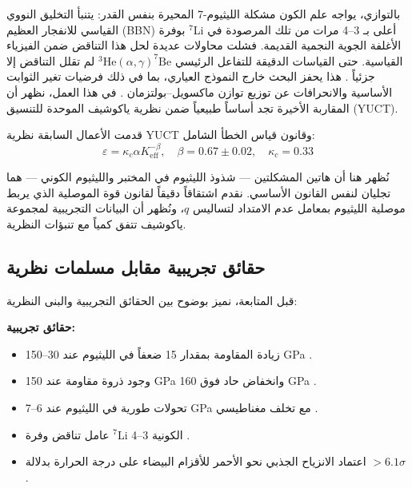 \documentclass[12pt,a4paper]{article}
\newcommand{\kappac}{\kappa_c}
\newcommand{\Ke}{K_{\mathrm{eff}}}
\newcommand{\alp}{\alpha}
\theoremstyle{remark}
\begin{document}
	بالتوازي، يواجه علم الكون مشكلة الليثيوم-7 المحيرة بنفس القدر: يتنبأ التخليق النووي القياسي للانفجار العظيم (BBN) بوفرة \(^7\)Li أعلى بـ 3–4 مرات من تلك المرصودة في الأغلفة الجوية النجمية القديمة. فشلت محاولات عديدة لحل هذا التناقض ضمن الفيزياء القياسية. حتى القياسات الدقيقة للتفاعل الرئيسي \(^3\mathrm{He}(\alpha,\gamma)^7\mathrm{Be}\) لم تقلل التناقض إلا جزئياً \cite{IAEA2017}. هذا يحفز البحث خارج النموذج العياري، بما في ذلك فرضيات تغير الثوابت الأساسية \cite{HAL2006} والانحرافات عن توزيع توازن ماكسويل–بولتزمان \cite{bertulani2015}. في هذا العمل، نظهر أن المقاربة الأخيرة تجد أساساً طبيعياً ضمن نظرية ياكوشيف الموحدة للتنسيق (YUCT).
	
	قدمت الأعمال السابقة \cite{yuct2026, appendixL, appendixC} نظرية YUCT وقانون قياس الخطأ الشامل:
	\begin{equation}
		\varepsilon = \kappac \alp \Ke^{-\beta}, \quad \beta = 0.67 \pm 0.02, \quad \kappac = 0.33
		\label{eq:universal}
	\end{equation}
	
	نُظهر هنا أن هاتين المشكلتين — شذوذ الليثيوم في المختبر والليثيوم الكوني — هما تجليان لنفس القانون الأساسي. نقدم اشتقاقاً دقيقاً لقانون قوة الموصلية الذي يربط موصلية الليثيوم بمعامل عدم الامتداد لتساليس \(q\)، ونُظهر أن البيانات التجريبية لمجموعة ياكوشيف \cite{fortov2001, yakushev2002} تتفق كمياً مع تنبؤات النظرية.
	
	\subsection{حقائق تجريبية مقابل مسلمات نظرية}
	\label{subsec:facts-vs-postulates}
	
	قبل المتابعة، نميز بوضوح بين الحقائق التجريبية والبنى النظرية:
	
	\textbf{حقائق تجريبية:}
	\begin{itemize}
		\item زيادة المقاومة بمقدار 15 ضعفاً في الليثيوم عند 30–150 GPa \cite{fortov2001}.
		\item وجود ذروة مقاومة عند 150 GPa وانخفاض حاد فوق 160 GPa \cite{yakushev2002}.
		\item تحولات طورية في الليثيوم عند 6–7 GPa مع تخلف مغناطيسي \cite{orlov2001}.
		\item عامل تناقض وفرة \(^7\)Li الكونية 3–4 \cite{bertulani2015}.
		\item اعتماد الانزياح الجذبي نحو الأحمر للأقزام البيضاء على درجة الحرارة بدلالة \(>6.1\sigma\) \cite{Crumpler2024}.
	\end{itemize}
	
\end{document}
